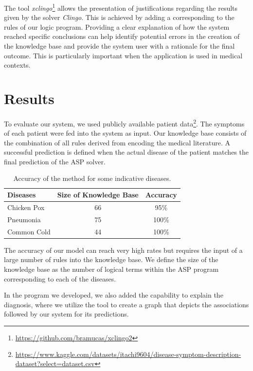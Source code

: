 \documentclass[10pt,leqno]{amsart}
\begin{document}
The tool \textit{xclingo}\footnote{\url{https://github.com/bramucas/xclingo2}} \cite{Cabalar_2020} allows the presentation of justifications regarding the results given by the solver \textit{Clingo}. This is achieved by adding a  corresponding to the rules of our logic program. Providing a clear explanation of how the system reached specific conclusions can help identify potential errors in the creation of the knowledge base and provide the system user with a rationale for the final outcome. This is particularly important when the application is used in medical contexts.

\section{Results}

To evaluate our system, we used publicly available patient data\footnote{\url{https://www.kaggle.com/datasets/itachi9604/disease-symptom-description-dataset?select=dataset.csv}}. The symptoms of each patient were fed into the system as input. Our knowledge base consists of the combination of all rules derived from encoding the medical literature. A successful prediction is defined when the actual disease of the patient matches the final prediction of the ASP solver.

\begin{table}[h]
    \centering
    \begin{tabular}{lcc}
    \hline
    Diseases & Size of Knowledge Base & Accuracy \\
    \hline
    \hline
    Chicken Pox      &  66  & 95\% \\
    Pneumonia        &  75  & 100\% \\
    Common Cold    &   44 & 100\% \\
    \hline
    \end{tabular}
    \caption{Accuracy of the method for some indicative diseases.}
\end{table}

The accuracy of our model can reach very high rates but requires the input of a large number of rules into the knowledge base. We define the size of the knowledge base as the number of logical terms within the ASP program corresponding to each of the diseases.

In the program we developed, we also added the capability to explain the diagnosis, where we utilize the  tool to create a graph that depicts the associations followed by our system for its predictions.
\end{document}
